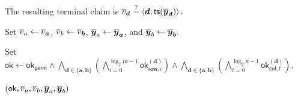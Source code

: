 \begin{algorithm}[!t]
{    The resulting terminal claim is
    \(
        \overline{v}_{\bm d}
        \mathrel{\overset{\mathrm{?}}{=}}
        \left\langle
            \bm d,
            {\sf ts}(\overline{\bm y}_{\bm d})
        \right\rangle.
    \)
}

Set
\(
    \overline{v}_a\leftarrow\overline{v}_{\bm a}
\),
\(
    \overline{v}_b\leftarrow\overline{v}_{\bm b}
\),
\(
    \overline{\bm y}_a\leftarrow\overline{\bm y}_{\bm a}
\),
and
\(
    \overline{\bm y}_b\leftarrow\overline{\bm y}_{\bm b}.
\)

Set
\(
    \mathsf{ok}
    \leftarrow
    \mathsf{ok}_{\mathsf{perm}}
    \wedge
    \bigwedge_{\bm d\in\{\bm a,\bm b\}}
    \left(
        \bigwedge_{i=0}^{\log_2m-1}
        \mathsf{ok}^{(\bm d)}_{\mathsf{row},i}
    \right)
    \wedge
    \bigwedge_{\bm d\in\{\bm a,\bm b\}}
    \left(
        \bigwedge_{t=0}^{\log_2\kappa-1}
        \mathsf{ok}^{(\bm d)}_{\mathsf{col},t}
    \right).
\)

\Return
\(
    (
        \mathsf{ok},
        \overline{v}_a,
        \overline{v}_b,
        \overline{\bm y}_a,
        \overline{\bm y}_b
    )
\)\;
\end{algorithm}
